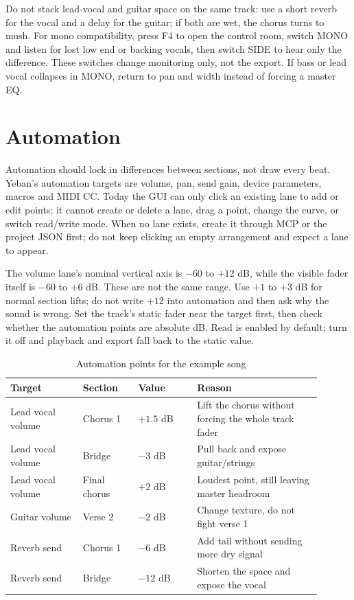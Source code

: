 Do not stack lead-vocal and guitar space on the same track: use a short reverb for the vocal and a delay for the guitar; if both are wet, the chorus turns to mush. For mono compatibility, press F4 to open the control room, switch MONO and listen for lost low end or backing vocals, then switch SIDE to hear only the difference. These switches change monitoring only, not the export. If bass or lead vocal collapses in MONO, return to pan and width instead of forcing a master EQ.

\section{Automation}

Automation should lock in differences between sections, not draw every beat. Yeban's automation targets are volume, pan, send gain, device parameters, macros and MIDI CC. Today the GUI can only click an existing lane to add or edit points; it cannot create or delete a lane, drag a point, change the curve, or switch read/write mode. When no lane exists, create it through MCP or the project JSON first; do not keep clicking an empty arrangement and expect a lane to appear.

The volume lane's nominal vertical axis is $-60$ to $+12$ dB, while the visible fader itself is $-60$ to $+6$ dB. These are not the same range. Use $+1$ to $+3$ dB for normal section lifts; do not write $+12$ into automation and then ask why the sound is wrong. Set the track's static fader near the target first, then check whether the automation points are absolute dB. Read is enabled by default; turn it off and playback and export fall back to the static value.

\begin{table}[htbp]
\centering
\small
\begin{tabular}{@{}p{0.21\linewidth}p{0.16\linewidth}p{0.17\linewidth}p{0.36\linewidth}@{}}
\hline
Target & Section & Value & Reason \\
\hline
Lead vocal volume & Chorus 1 & $+1.5$ dB & Lift the chorus without forcing the whole track fader \\
Lead vocal volume & Bridge & $-3$ dB & Pull back and expose guitar/strings \\
Lead vocal volume & Final chorus & $+2$ dB & Loudest point, still leaving master headroom \\
Guitar volume & Verse 2 & $-2$ dB & Change texture, do not fight verse 1 \\
Reverb send & Chorus 1 & $-6$ dB & Add tail without sending more dry signal \\
Reverb send & Bridge & $-12$ dB & Shorten the space and expose the vocal \\
\hline
\end{tabular}
\caption{Automation points for the example song}
\label{tab:walk-automation}
\end{table}

